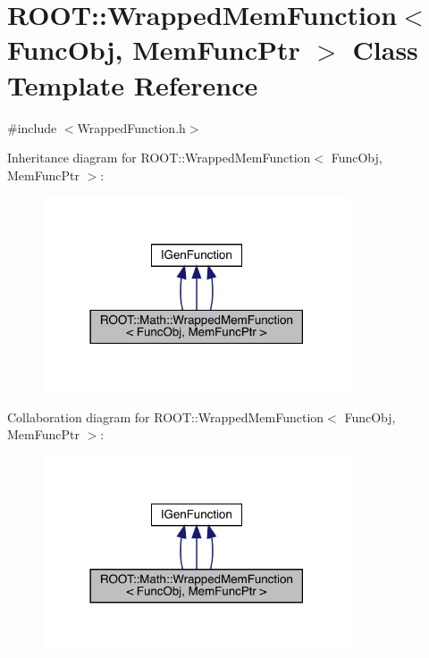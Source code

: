 \hypertarget{classROOT_1_1Math_1_1WrappedMemFunction}{}\section{R\+O\+OT\+:\+:Wrapped\+Mem\+Function$<$ Func\+Obj, Mem\+Func\+Ptr $>$ Class Template Reference}
\label{classROOT_1_1Math_1_1WrappedMemFunction}


{\ttfamily \#include $<$Wrapped\+Function.\+h$>$}



Inheritance diagram for R\+O\+OT\+:\+:Wrapped\+Mem\+Function$<$ Func\+Obj, Mem\+Func\+Ptr $>$\+:
\nopagebreak
\begin{figure}[H]
\begin{center}
\leavevmode
\includegraphics[width=258pt]{df/d6b/classROOT_1_1Math_1_1WrappedMemFunction__inherit__graph}
\end{center}
\end{figure}


Collaboration diagram for R\+O\+OT\+:\+:Wrapped\+Mem\+Function$<$ Func\+Obj, Mem\+Func\+Ptr $>$\+:
\nopagebreak
\begin{figure}[H]
\begin{center}
\leavevmode
\includegraphics[width=258pt]{de/d86/classROOT_1_1Math_1_1WrappedMemFunction__coll__graph}
\end{center}
\end{figure}
